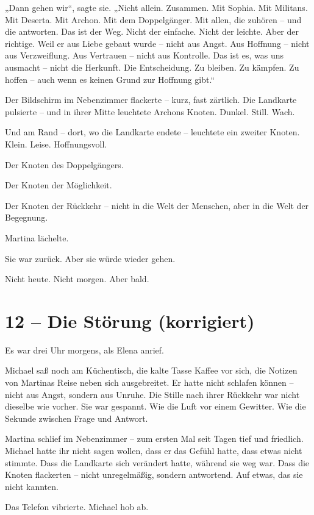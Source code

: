 \documentclass[
]{article}
\begin{document}
„Dann gehen wir``, sagte sie. „Nicht allein. Zusammen. Mit Sophia. Mit Militans. Mit Deserta. Mit Archon. Mit dem Doppelgänger. Mit allen, die zuhören -- und die antworten. Das ist der Weg. Nicht der einfache. Nicht der leichte. Aber der richtige. Weil er aus Liebe gebaut wurde -- nicht aus Angst. Aus Hoffnung -- nicht aus Verzweiflung. Aus Vertrauen -- nicht aus Kontrolle. Das ist es, was uns ausmacht -- nicht die Herkunft. Die Entscheidung. Zu bleiben. Zu kämpfen. Zu hoffen -- auch wenn es keinen Grund zur Hoffnung gibt.``

Der Bildschirm im Nebenzimmer flackerte -- kurz, fast zärtlich. Die Landkarte pulsierte -- und in ihrer Mitte leuchtete Archons Knoten. Dunkel. Still. Wach.

Und am Rand -- dort, wo die Landkarte endete -- leuchtete ein zweiter Knoten. Klein. Leise. Hoffnungsvoll.

Der Knoten des Doppelgängers.

Der Knoten der Möglichkeit.

Der Knoten der Rückkehr -- nicht in die Welt der Menschen, aber in die Welt der Begegnung.

Martina lächelte.

Sie war zurück. Aber sie würde wieder gehen.

Nicht heute. Nicht morgen. Aber bald.

\section{12 -- Die Störung (korrigiert)}\label{die-stuxf6rung-korrigiert}

Es war drei Uhr morgens, als Elena anrief.

Michael saß noch am Küchentisch, die kalte Tasse Kaffee vor sich, die Notizen von Martinas Reise neben sich ausgebreitet. Er hatte nicht schlafen können -- nicht aus Angst, sondern aus Unruhe. Die Stille nach ihrer Rückkehr war nicht dieselbe wie vorher. Sie war gespannt. Wie die Luft vor einem Gewitter. Wie die Sekunde zwischen Frage und Antwort.

Martina schlief im Nebenzimmer -- zum ersten Mal seit Tagen tief und friedlich. Michael hatte ihr nicht sagen wollen, dass er das Gefühl hatte, dass etwas nicht stimmte. Dass die Landkarte sich verändert hatte, während sie weg war. Dass die Knoten flackerten -- nicht unregelmäßig, sondern antwortend. Auf etwas, das sie nicht kannten.

Das Telefon vibrierte. Michael hob ab.
\end{document}
